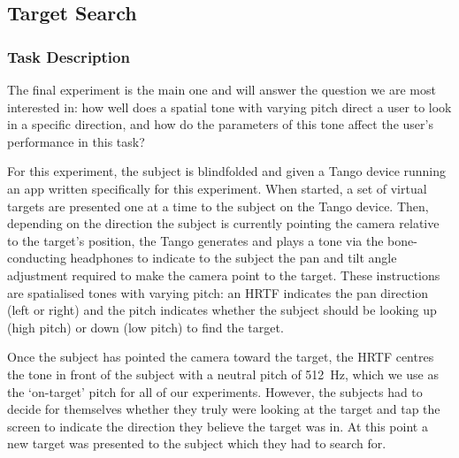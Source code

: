 \documentclass[format=sigconf, review=true, screen=true, anonymous=true]{acmart}
\begin{document}

\subsection{Target Search}

\subsubsection{Task Description}

The final experiment is the main one and will answer the question we are most interested in: how well does a spatial tone with varying pitch direct a user to look in a specific direction, and how do the parameters of this tone affect the user's performance in this task? %

For this experiment, the subject is blindfolded and given a Tango device running an app written specifically for this experiment. When started, a set of virtual targets are presented one at a time to the subject on the Tango device. Then, depending on the direction the subject is currently pointing the camera relative to the target's position, the Tango generates and plays a tone via the bone-conducting headphones to indicate to the subject the pan and tilt angle adjustment required to make the camera point to the target. These instructions are spatialised tones with varying pitch: an HRTF indicates the pan direction (left or right) and the pitch indicates whether the subject should be looking up (high pitch) or down (low pitch) to find the target. 

Once the subject has pointed the camera toward the target, the HRTF centres the tone in front of the subject with a neutral pitch of \SI{512}{\hertz}, which we use as the `on-target' pitch for all of our experiments.  However, the subjects had to decide for themselves whether they truly were looking at the target and tap the screen to indicate the direction they believe the target was in. At this point a new target was presented to the subject which they had to search for. 
\end{document}
